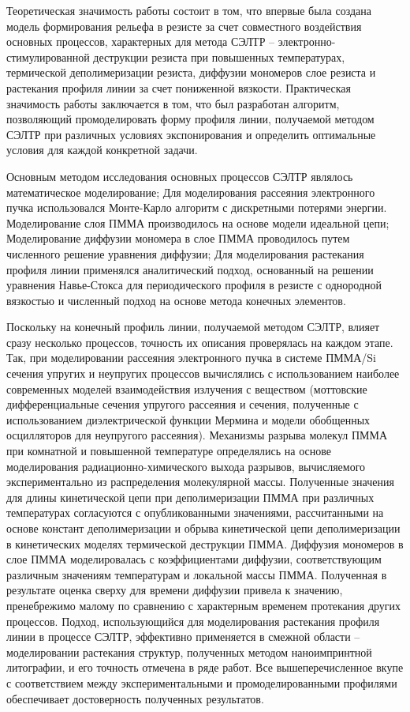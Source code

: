 \influence

Теоретическая значимость работы состоит в том, что впервые была создана модель формирования рельефа в резисте за счет совместного воздействия основных процессов, характерных для метода СЭЛТР – электронно-стимулированной деструкции резиста при повышенных температурах, термической деполимеризации резиста, диффузии мономеров слое резиста и растекания профиля линии за счет пониженной вязкости. Практическая значимость работы заключается в том, что был разработан алгоритм, позволяющий промоделировать форму профиля линии, получаемой методом СЭЛТР при различных условиях экспонирования и определить оптимальные условия для каждой конкретной задачи.


\methods

Основным методом исследования основных процессов СЭЛТР являлось математическое моделирование; Для моделирования рассеяния электронного пучка использовался Монте-Карло алгоритм с дискретными потерями энергии. Моделирование слоя ПММА производилось на основе модели идеальной цепи; Моделирование диффузии мономера в слое ПММА проводилось путем численного решение уравнения диффузии; Для моделирования растекания профиля линии применялся аналитический подход, основанный на решении уравнения Навье-Стокса для периодического профиля в резисте с однородной вязкостью и численный подход на основе метода конечных элементов.


\probation

Поскольку на конечный профиль линии, получаемой методом СЭЛТР, влияет сразу несколько процессов, точность их описания проверялась на каждом этапе. Так, при моделировании рассеяния электронного пучка в системе ПММА/Si сечения упругих и неупругих процессов вычислялись с использованием наиболее современных моделей взаимодействия излучения с веществом (моттовские дифференциальные сечения упругого рассеяния и сечения, полученные с использованием диэлектрической функции Мермина и модели обобщенных осцилляторов для неупругого рассеяния). Механизмы разрыва молекул ПММА при комнатной и повышенной температуре определялись на основе моделирования радиационно-химического выхода разрывов, вычисляемого экспериментально из распределения молекулярной массы. Полученные значения для длины кинетической цепи при деполимеризации ПММА при различных температурах согласуются с опубликованными значениями, рассчитанными на основе констант деполимеризации и обрыва кинетической цепи деполимеризации в кинетических моделях термической деструкции ПММА. Диффузия мономеров в слое ПММА моделировалась с коэффициентами диффузии, соответствующим различным значениям температурам и локальной массы ПММА. Полученная в результате оценка сверху для времени диффузии привела к значению, пренебрежимо малому по сравнению с характерным временем протекания других процессов. Подход, использующийся для моделирования растекания профиля линии в процессе СЭЛТР, эффективно применяется в смежной области – моделировании растекания структур, полученных методом наноимпринтной литографии, и его точность отмечена в ряде работ. Все вышеперечисленное вкупе с соответствием между экспериментальными и промоделированными профилями обеспечивает достоверность полученных результатов.

